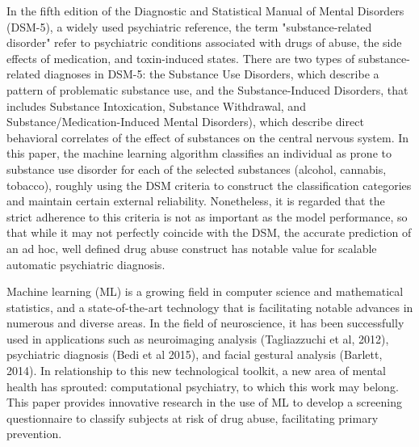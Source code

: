 \documentclass[8pt]{article}
\begin{document}
{\begin{multicols}{2}
In the fifth edition of the Diagnostic and Statistical Manual of Mental Disorders (DSM-5), a widely used psychiatric reference, the term "substance-related disorder" refer to psychiatric conditions associated with drugs of abuse, the side effects of medication, and toxin-induced states. There are two types of substance-related diagnoses in DSM-5: the Substance Use Disorders, which describe a pattern of problematic substance use, and the Substance-Induced Disorders, that includes Substance Intoxication, Substance Withdrawal, and Substance/Medication-Induced
Mental Disorders), which describe direct behavioral correlates of the effect of substances on the central nervous system. In this paper, the machine learning algorithm classifies an individual as prone to substance use disorder for each of the selected substances (alcohol, cannabis, tobacco), roughly using the DSM criteria to construct the classification categories and maintain certain external reliability. Nonetheless, it is regarded that the strict adherence to this criteria is not as important as the model performance, so that while it may not perfectly coincide with the DSM, the accurate prediction of an ad hoc, well defined drug abuse construct has notable value for scalable automatic psychiatric diagnosis. 

Machine learning (ML) is a growing field in computer science and mathematical statistics, and a state-of-the-art technology that is facilitating notable advances in numerous and diverse areas. In the field of neuroscience, it has been successfully used in applications such as neuroimaging analysis (Tagliazzuchi et al, 2012), psychiatric diagnosis (Bedi et al 2015), and facial gestural analysis (Barlett, 2014). In relationship to this new technological toolkit, a new area of mental health has sprouted: computational psychiatry, to which this work may belong. This paper provides innovative research in the use of ML to develop a screening questionnaire to classify subjects at risk of drug abuse, facilitating primary prevention. 


\end{multicols}}
\end{document}
